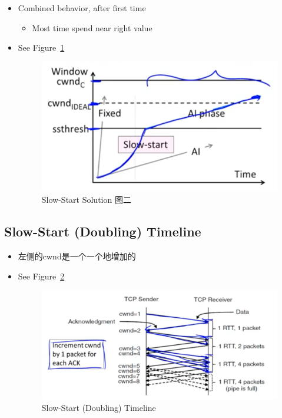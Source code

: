 \documentclass[12pt]{ctexart}   %
\begin{document}
\begin{itemize}
		 \item Combined behavior, after first time
		 \begin{itemize}
		 	\item Most time spend near right value
		 \end{itemize}
		 \item See Figure~\ref{fig:7-6-3}
		  
		 \begin{figure}[h!] %
		\centering
		 \includegraphics[scale=0.7]{images/7-6-3}
		\caption{ Slow-Start Solution 图二 }
		 \label{fig:7-6-3}
		 \end{figure}	
	\end{itemize}
	
	\subsection{Slow-Start (Doubling) Timeline}
	\begin{itemize}
		\item 左侧的cwnd是一个一个地增加的
		\item See Figure~\ref{fig:7-6-4}
		  
		 \begin{figure}[h!] %
		\centering
		 \includegraphics[scale=0.7]{images/7-6-4}
		\caption{ Slow-Start (Doubling) Timeline }
		 \label{fig:7-6-4}
		 \end{figure}
	\end{itemize}
	
\end{document}
